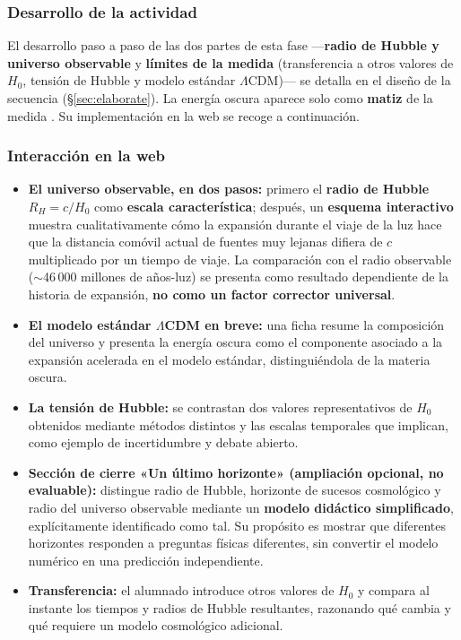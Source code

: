 \subsubsection*{Desarrollo de la actividad}

El desarrollo paso a paso de las dos partes de esta fase ---\textbf{radio de Hubble y universo observable} y \textbf{límites de la medida} (transferencia a otros valores de $H_{0}$, tensión de Hubble y modelo estándar $\Lambda$CDM)--- se detalla en el diseño de la secuencia (§\ref{sec:elaborate}). La energía oscura aparece solo como \textbf{matiz} de la medida \parencite{hyde2021,pereira2019,raymundo2022}. Su implementación en la web se recoge a continuación.

\subsubsection*{Interacción en la web}

\begin{itemize}
\item \textbf{El universo observable, en dos pasos:} primero el \textbf{radio de Hubble} $R_H=c/H_{0}$ como \textbf{escala característica}; después, un \textbf{esquema interactivo} muestra cualitativamente cómo la expansión durante el viaje de la luz hace que la distancia comóvil actual de fuentes muy lejanas difiera de $c$ multiplicado por un tiempo de viaje. La comparación con el radio observable ($\sim$46\,000 millones de años-luz) se presenta como resultado dependiente de la historia de expansión, \textbf{no como un factor corrector universal}.
\item \textbf{El modelo estándar $\Lambda$CDM en breve:} una ficha resume la composición del universo y presenta la energía oscura como el componente asociado a la expansión acelerada en el modelo estándar, distinguiéndola de la materia oscura.
\item \textbf{La tensión de Hubble:} se contrastan dos valores representativos de $H_0$ obtenidos mediante métodos distintos y las escalas temporales que implican, como ejemplo de incertidumbre y debate abierto.
\item \textbf{Sección de cierre «Un último horizonte» (ampliación opcional, no evaluable):} distingue radio de Hubble, horizonte de sucesos cosmológico y radio del universo observable mediante un \textbf{modelo didáctico simplificado}, explícitamente identificado como tal. Su propósito es mostrar que diferentes horizontes responden a preguntas físicas diferentes, sin convertir el modelo numérico en una predicción independiente.
\item \textbf{Transferencia:} el alumnado introduce otros valores de $H_{0}$ y compara al instante los tiempos y radios de Hubble resultantes, razonando qué cambia y qué requiere un modelo cosmológico adicional.
\end{itemize}

